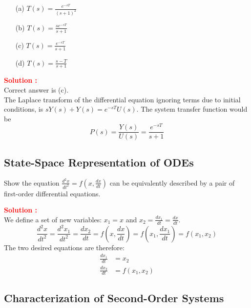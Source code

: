 \documentclass[12pt]{article}
\begin{document}
\begin{itemize}
    \item[(a)] \(T(s) = \frac{e^{-sT}}{(s+1)^2}\)
    \item[(b)] \(T(s) = \frac{se^{-sT}}{s+1}\)
    \item[(c)] \(T(s) = \frac{e^{-sT}}{s+1}\)
    \item[(d)] \(T(s) = \frac{s-T}{s+1}\)
\end{itemize}

\textbf{\textcolor{red}{Solution :}} \\
Correct answer is (c).\\
The Laplace transform of the differential equation ignoring terms due to initial conditions, is \(sY(s) + Y(s) = e^{-sT}U(s)\). The system transfer function would be 
\begin{equation}
    P(s) = \frac{Y(s)}{U(s)} = \frac{e^{-sT}}{s+1}
\end{equation}

\clearpage
\subsection{State-Space Representation of ODEs}

Show the equation \(\frac{d^2x}{dt^2} = f(x, \frac{dx}{dt})\) can be equivalently described by a pair of first-order differential equations.

\textbf{\textcolor{red}{Solution :}} \\
We define a set of new variables: \(x_1 = x\) and \(x_2 = \frac{dx_1}{dt} = \frac{dx}{dt}\).
\begin{equation}
    \frac{d^2x}{dt^2} = \frac{d^2x_1}{dt^2} = \frac{dx_2}{dt} = f(x, \frac{dx}{dt}) = f(x_1, \frac{dx_1}{dt}) = f(x_1,x_2)
\end{equation}
The two desired equations are therefore:
\begin{align*}
\frac{dx_1}{dt} &= x_2 \\
\frac{dx_2}{dt} &= f(x_1, x_2)
\end{align*}

\clearpage

\subsection{Characterization of Second-Order Systems}
\end{document}
